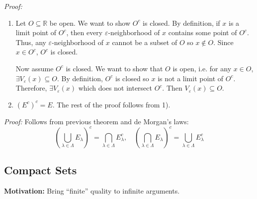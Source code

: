 \documentclass[12pt]{report}
\newcommand{\R}{\mathbb{R}}
\newcommand{\ep}{\varepsilon}
\newenvironment*{tbox}[2][gray]{
    \begin{tcolorbox}[
        parbox=false,
        colback=#1!5!white,
        colframe=#1!75!black,
        breakable,
        title={#2}
    ]}
    {\end{tcolorbox}}
\begin{document}
    \begin{tbox}{\textbf{Theorem:} 
        \begin{enumerate}
            \item A set $O$ is open $\iff O^c$ is closed
            \item A set $F$ is closed $\iff F^c$ is open
        \end{enumerate}}
        \emph{Proof:} 
        \begin{enumerate}
            \item Let $O \subseteq \R$ be open. We want to show $O^c$ is closed. By definition, if $x$ is a limit point of $O^c$, then every $\ep$-neighborhood of $x$ contains some point of $O^c$. Thus, any $\ep$-neighborhood of $x$ cannot be a subset of $O$ so $x \notin O$. Since $x \in O^c$, $O^c$ is closed.
            
            Now assume $O^c$ is closed. We want to show that $O$ is open, i.e. for any $x \in O$, $\exists V_{\ep}(x) \subseteq O$. By definition, $O^c$ is closed so $x$ is not a limit point of $O^c$. Therefore, $\exists V_{\ep}(x)$ which does not intersect $O^c$. Then $V_{\ep}(x) \subseteq O$.

            \item $(E^c)^c = E$. The rest of the proof follows from 1). 
        \end{enumerate}
    \end{tbox}

    \begin{tbox}{\textbf{Theorem:} 
        \begin{enumerate}
            \item The union of a finite collection of closed sets is closed
            \item The intersection of an arbitary collection of closed sets is closed
        \end{enumerate}}
        \emph{Proof:} Follows from previous theorem and de Morgan's laws: 
        \[\left(\bigcup_{\lambda \in \Lambda} E_{\lambda}\right)^c = \bigcap_{\lambda \in \Lambda} E_{\lambda}^c, \quad \left(\bigcap_{\lambda \in \Lambda} E_{\lambda}\right)^c = \bigcup_{\lambda \in \Lambda} E_{\lambda}^c\]
    \end{tbox}

\subsection*{Compact Sets}
    \textbf{Motivation:} Bring ``finite'' quality to infinite arguments. 
\end{document}
